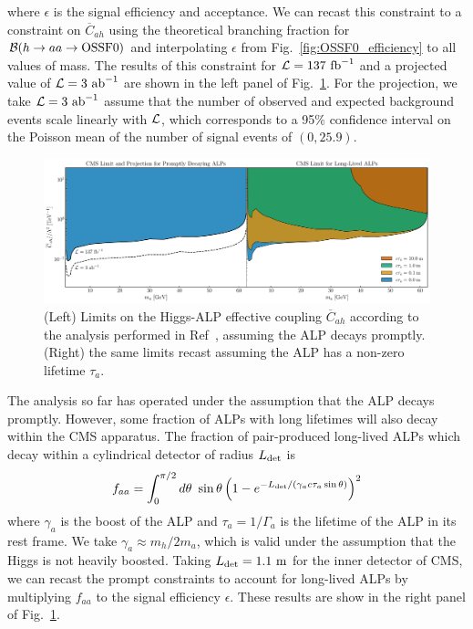 where $\epsilon$ is the signal efficiency and acceptance. We can recast this constraint to a constraint on ${\overline C}_{ah}$ using the theoretical branching fraction for ${\cal B}(h\rightarrow aa \rightarrow {\rm OSSF0})$ and interpolating $\epsilon$ from Fig.~\ref{fig:OSSF0_efficiency} to all values of mass. The results of this constraint for ${\cal L} = 137~{\rm fb}^{-1}$ and a projected value of ${\cal L} = 3~{\rm ab}^{-1}$ are shown in the left panel of Fig.~\ref{fig:Cah_CMS}. For the projection, we take ${\cal L} = 3~{\rm ab}^{-1}$ assume that the number of observed and expected background events scale linearly with ${\cal L}$, which corresponds to a 95\% confidence interval on the Poisson mean of the number of signal events of $(0, 25.9)$. 

\begin{figure}[t!]
    \centering
    \includegraphics[trim={4cm 0 5cm 0}, width=\linewidth]{figures/chapter5/Cah_CMS_constraint.pdf}
    \caption[Limits on the effective Higgs-ALP coupling at CMS.]{(Left) Limits on the Higgs-ALP effective coupling $\overline{C}_{ah}$  according to the analysis performed in Ref~\cite{CMS:2019lwf}, assuming the ALP decays promptly. (Right) the same limits recast assuming the ALP has a non-zero lifetime $\tau_a$.}
    \label{fig:Cah_CMS}
\end{figure}

The analysis so far has operated under the assumption that the ALP decays promptly. However, some fraction of ALPs with long lifetimes will also decay within the CMS apparatus. The fraction of pair-produced long-lived ALPs which decay within a cylindrical detector of radius $L_{\rm det}$ is \cite{Bauer:2017ris}
\begin{align}
    f_{aa} = \int_0^{\pi/2}d\theta~\sin{\theta}\left(1-e^{-L_{\rm det}/(\gamma_a c \tau_a \sin{\theta})}\right)^2
\end{align}
where $\gamma_a$ is the boost of the ALP and $\tau_a = 1/\Gamma_a$ is the lifetime of the ALP in its rest frame. We take $\gamma_a \approx m_h/2m_a$, which is valid under the assumption that the Higgs is not heavily boosted. Taking ${L}_{\rm det} = 1.1~{\rm m}$ for the inner detector of CMS, we can recast the prompt constraints to account for long-lived ALPs by multiplying $f_{aa}$ to the signal efficiency $\epsilon$. These results are show in the right panel of Fig.~\ref{fig:Cah_CMS}. 


